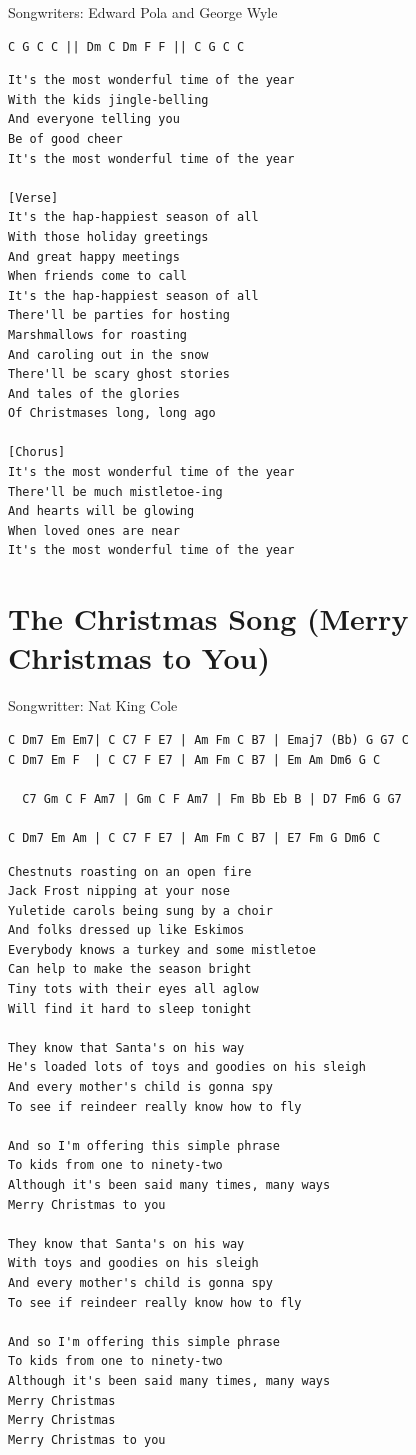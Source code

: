 \documentclass[
]{article}
\begin{document}
Songwriters: Edward Pola and George Wyle

\begin{verbatim}
C G C C || Dm C Dm F F || C G C C 
\end{verbatim}

\begin{verbatim}
It's the most wonderful time of the year
With the kids jingle-belling
And everyone telling you
Be of good cheer
It's the most wonderful time of the year

[Verse]
It's the hap-happiest season of all
With those holiday greetings
And great happy meetings
When friends come to call
It's the hap-happiest season of all
There'll be parties for hosting
Marshmallows for roasting
And caroling out in the snow
There'll be scary ghost stories
And tales of the glories
Of Christmases long, long ago

[Chorus]
It's the most wonderful time of the year
There'll be much mistletoe-ing
And hearts will be glowing
When loved ones are near
It's the most wonderful time of the year
\end{verbatim}

\hypertarget{the-christmas-song-merry-christmas-to-you}{%
\section{The Christmas Song (Merry Christmas to
You)}\label{the-christmas-song-merry-christmas-to-you}}

Songwritter: Nat King Cole

\begin{verbatim}
C Dm7 Em Em7| C C7 F E7 | Am Fm C B7 | Emaj7 (Bb) G G7 C
C Dm7 Em F  | C C7 F E7 | Am Fm C B7 | Em Am Dm6 G C

  C7 Gm C F Am7 | Gm C F Am7 | Fm Bb Eb B | D7 Fm6 G G7 

C Dm7 Em Am | C C7 F E7 | Am Fm C B7 | E7 Fm G Dm6 C
\end{verbatim}

\begin{verbatim}
Chestnuts roasting on an open fire
Jack Frost nipping at your nose
Yuletide carols being sung by a choir
And folks dressed up like Eskimos
Everybody knows a turkey and some mistletoe
Can help to make the season bright
Tiny tots with their eyes all aglow
Will find it hard to sleep tonight

They know that Santa's on his way
He's loaded lots of toys and goodies on his sleigh
And every mother's child is gonna spy
To see if reindeer really know how to fly

And so I'm offering this simple phrase
To kids from one to ninety-two
Although it's been said many times, many ways
Merry Christmas to you

They know that Santa's on his way
With toys and goodies on his sleigh
And every mother's child is gonna spy
To see if reindeer really know how to fly

And so I'm offering this simple phrase
To kids from one to ninety-two
Although it's been said many times, many ways
Merry Christmas
Merry Christmas
Merry Christmas to you
\end{verbatim}
\end{document}
